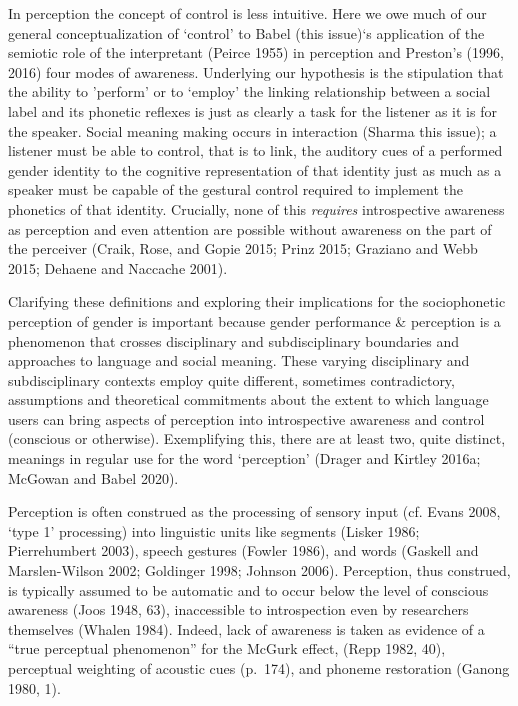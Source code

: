 \documentclass[
  letterpaper,
  DIV=11,
  numbers=noendperiod]{scrartcl}
\begin{document}
In perception the concept of control is less intuitive. Here we owe much
of our general conceptualization of `control' to Babel (this issue)`s
application of the semiotic role of the interpretant (Peirce 1955) in
perception and Preston's (1996, 2016) four modes of awareness.
Underlying our hypothesis is the stipulation that the ability to
'perform' or to `employ' the linking relationship between a social label
and its phonetic reflexes is just as clearly a task for the listener as
it is for the speaker. Social meaning making occurs in interaction
(Sharma this issue); a listener must be able to control, that is to
link, the auditory cues of a performed gender identity to the cognitive
representation of that identity just as much as a speaker must be
capable of the gestural control required to implement the phonetics of
that identity. Crucially, none of this \emph{requires} introspective
awareness as perception and even attention are possible without
awareness on the part of the perceiver (Craik, Rose, and Gopie 2015;
Prinz 2015; Graziano and Webb 2015; Dehaene and Naccache 2001).

Clarifying these definitions and exploring their implications for the
sociophonetic perception of gender is important because gender
performance \& perception is a phenomenon that crosses disciplinary and
subdisciplinary boundaries and approaches to language and social
meaning. These varying disciplinary and subdisciplinary contexts employ
quite different, sometimes contradictory, assumptions and theoretical
commitments about the extent to which language users can bring aspects
of perception into introspective awareness and control (conscious or
otherwise). Exemplifying this, there are at least two, quite distinct,
meanings in regular use for the word `perception' (Drager and Kirtley
2016a; McGowan and Babel 2020).

Perception is often construed as the processing of sensory input (cf.
Evans 2008, `type 1' processing) into linguistic units like segments
(Lisker 1986; Pierrehumbert 2003), speech gestures (Fowler 1986), and
words (Gaskell and Marslen-Wilson 2002; Goldinger 1998; Johnson 2006).
Perception, thus construed, is typically assumed to be automatic and to
occur below the level of conscious awareness (Joos 1948, 63),
inaccessible to introspection even by researchers themselves (Whalen
1984). Indeed, lack of awareness is taken as evidence of a ``true
perceptual phenomenon'' for the McGurk effect, (Repp 1982, 40),
perceptual weighting of acoustic cues (p.~174), and phoneme restoration
(Ganong 1980, 1).
\end{document}
